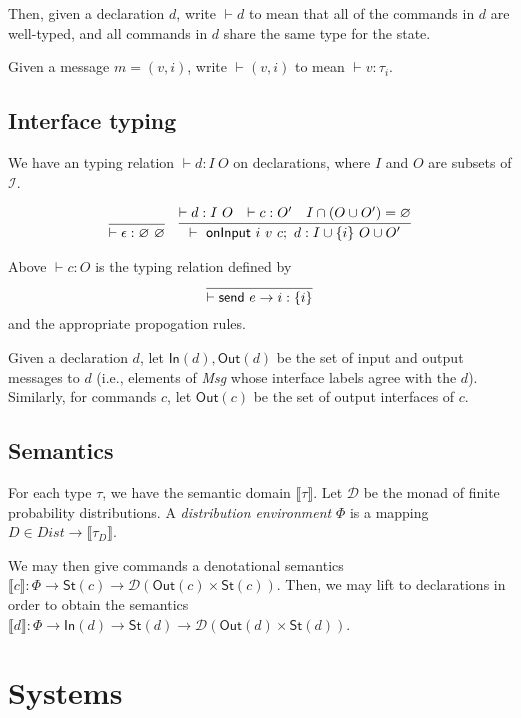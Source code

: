 \documentclass{article}
\begin{document}
Then, given a declaration $d$, write $\vdash d$ to mean that all of the commands in $d$ are well-typed, and all commands in $d$ share the same type for the state.

Given a message $m = (v, i)$, write $\vdash (v,i)$ to mean $\vdash v : \tau_i$.

\subsection{Interface typing}
We have an typing relation $\vdash d : I\ O$ on declarations, where $I$ and $O$ are subsets of $\mathcal{I}$.

\begin{align*}
    &\infer{\vdash \epsilon : \varnothing\ \varnothing}{} & 
       \infer{\vdash\ \textsf{onInput}\ i\ v\ c;\ d : I \cup \{i\}\ O \cup O'}{\vdash d : I\ O & \vdash c : O' & I \cap (O \cup O') = \varnothing} 
\end{align*}

Above $\vdash c : O$ is the typing relation defined by
\[\infer{\vdash \textsf{send}\ e \to i: \{i\}}{}\]
and the appropriate propogation rules.

Given a declaration $d$, let $\textsf{In}(d), \textsf{Out}(d)$ be the set of input and output messages to $d$ (i.e., elements of \textit{Msg} whose interface labels agree with the $d$). Similarly, for commands $c$, let $\textsf{Out}(c)$ be the set of output interfaces of $c$.

\subsection{Semantics}

For each type $\tau$, we have the semantic domain $\llbracket \tau \rrbracket$.
Let $\mathcal{D}$ be the monad of finite probability distributions. 
A \emph{distribution environment} $\Phi$ is a mapping $D \in \textit{Dist} \to \llbracket \tau_D \rrbracket$.

We may then give commands a denotational semantics $\llbracket c \rrbracket : \Phi \to \textsf{St}(c) \to \mathcal{D}(\textsf{Out}(c) \times \textsf{St}(c))$. 
Then, we may lift to declarations in order to obtain the semantics $\llbracket d \rrbracket : \Phi \to \textsf{In}(d) \to \textsf{St}(d) \to \mathcal{D}(\textsf{Out}(d) \times \textsf{St}(d))$. 

\section{Systems}
\end{document}
